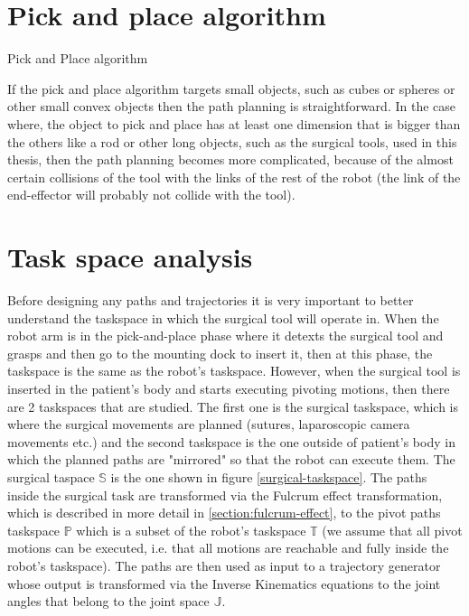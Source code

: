 \section{Pick and place algorithm}

\begin{algorithm}[H]
\SetAlgoLined
{}
\caption{Pick and Place algorithm}
\end{algorithm}

If the pick and place algorithm targets small objects, such as cubes or spheres or other small convex objects then the path planning is straightforward. In the case where, the object to pick and place has at least one 
dimension that is bigger than the others like a rod or other long objects, such as the surgical tools, used in this thesis, then the path planning becomes more complicated, because of the almost certain collisions 
of the tool with the links of the rest of the robot (the link of the end-effector will probably not collide with the tool).


\section{Task space analysis}

Before designing any paths and trajectories it is very important to better understand the taskspace in which the surgical tool will operate in. When the robot arm is in the pick-and-place phase where it detexts the surgical 
tool and grasps and then go to the mounting dock to insert it, then at this phase, the taskspace is the same as the robot's taskspace. However, when the surgical tool is inserted in the patient's body and starts executing 
pivoting motions, then there are 2 taskspaces that are studied. The first one is the surgical taskspace, which is where the surgical movements are planned (sutures, laparoscopic camera movements etc.) and the second 
taskspace is the one outside of patient's body in which the planned paths are "mirrored" so that the robot can execute them. The surgical taspace $\mathbb{S}$ is the one shown in figure \ref{surgical-taskspace}. The paths inside 
the surgical task are transformed via the Fulcrum effect transformation, which is described in more detail in \ref{section:fulcrum-effect}, to the pivot paths taskspace $\mathbb{P}$ which is a subset of the robot's taskspace 
$\mathbb{T}$ (we assume that all pivot motions can be executed, i.e. that all motions are reachable and fully inside the robot's taskspace). The paths are then used as input to a trajectory generator whose output 
is transformed via the Inverse Kinematics equations to the joint angles that belong to the joint space $\mathbb{J}$. \\

